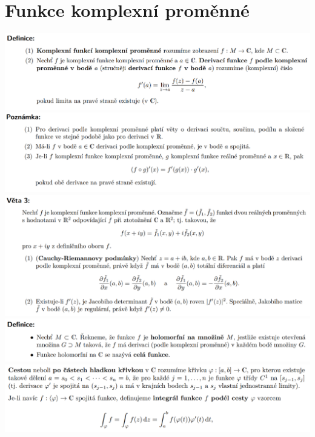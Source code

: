 \documentclass[12pt,a4paper]{article}
\begin{document}
\section{Funkce komplexní proměnné}
	\begin{center}
		\includegraphics[width=\textwidth]{img/5komp/2020-06-21 09 52 00.png}\vspace{0.3cm}
		\includegraphics[width=\textwidth]{img/5komp/2020-06-21 09 52 13.png}\vspace{0.3cm}
		\includegraphics[width=\textwidth]{img/5komp/2020-06-21 09 52 21.png}\vspace{0.3cm}
		\includegraphics[width=\textwidth]{img/5komp/2020-06-21 09 52 29.png}\vspace{0.3cm}
		\includegraphics[width=\textwidth]{img/5komp/2020-06-21 09 53 40.png}\vspace{0.3cm}

\end{center}
\end{document}
